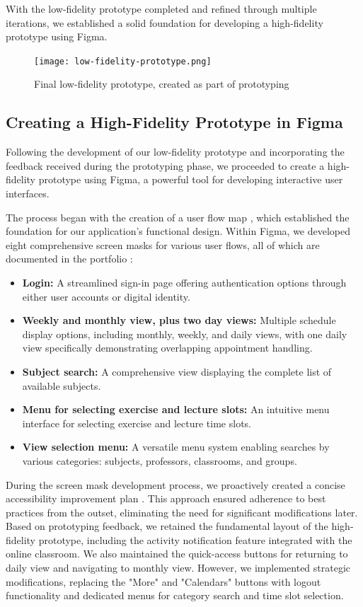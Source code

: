 \documentclass[sigconf,nonacm]{acmart}
\begin{document}
\noindent
With the low-fidelity prototype completed and refined through multiple iterations, we established a solid foundation for developing a high-fidelity prototype using Figma.

\begin{figure}[h]
  \centering
  \texttt{[image: low-fidelity-prototype.png]}
  \caption{Final low-fidelity prototype, created as part of prototyping}
\end{figure}

\subsection{Creating a High-Fidelity Prototype in Figma}
Following the development of our low-fidelity prototype and incorporating the feedback received during the prototyping phase, we proceeded to create a high-fidelity prototype using Figma, a powerful tool for developing interactive user interfaces.

The process began with the creation of a user flow map \cite{jouneymap}, which established the foundation for our application's functional design. Within Figma, we developed eight comprehensive screen masks for various user flows, all of which are documented in the portfolio \cite{figma1}:

\begin{itemize}
\item \textbf{Login:} A streamlined sign-in page offering authentication options through either user accounts or digital identity.
\item \textbf{Weekly and monthly view, plus two day views:} Multiple schedule display options, including monthly, weekly, and daily views, with one daily view specifically demonstrating overlapping appointment handling.
\item \textbf{Subject search:} A comprehensive view displaying the complete list of available subjects.
\item \textbf{Menu for selecting exercise and lecture slots:} An intuitive menu interface for selecting exercise and lecture time slots.
\item \textbf{View selection menu:} A versatile menu system enabling searches by various categories: subjects, professors, classrooms, and groups.
\end{itemize}

During the screen mask development process, we proactively created a concise accessibility improvement plan \cite{dostopnost}. This approach ensured adherence to best practices from the outset, eliminating the need for significant modifications later. Based on prototyping feedback, we retained the fundamental layout of the high-fidelity prototype, including the activity notification feature integrated with the online classroom. We also maintained the quick-access buttons for returning to daily view and navigating to monthly view. However, we implemented strategic modifications, replacing the "More" and "Calendars" buttons with logout functionality and dedicated menus for category search and time slot selection.
\end{document}
